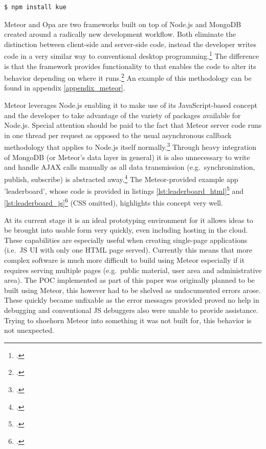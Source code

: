 \begin{appendices}
\begin{subappendices}
\begin{lstlisting}[language=javascript,
morekeywords={npm},
caption={Installing Kue via command-line},
label=lst:installkue]
$ npm install kue
\end{lstlisting}
\newpage

\label{appendix_meteor}
\FloatBarrier
Meteor and Opa are two frameworks built on top of Node.js and MongoDB created around a radically new development workflow. Both eliminate the distinction between client-side and server-side code, instead the developer writes code in a very similar way to conventional desktop programming.\footcite[Cf.][]{meteorDocs} The difference is that the framework provides functionality to that enables the code to alter its behavior depending on where it runs.\footcite[Cf.][]{meteorDocs} An example of this methodology can be found in appendix \ref{appendix_meteor}.

Meteor leverages Node.js enabling it to make use of its JavaScript-based concept and  the developer to take advantage of the variety of packages available for Node.js. Special attention should be paid to the fact that Meteor server code runs in one thread per request as opposed to the usual asynchronous callback methodology that applies to Node.js itself normally.\footcite[Cf.][]{meteorDocs} Through heavy integration of MongoDB (or Meteor's data layer in general) it is also unnecessary to write and handle AJAX calls manually as all data transmission (e.g.\ synchronization, publish, subscribe) is abstracted away.\footcite[Cf.][]{meteorDocs} The Meteor-provided example app 'leaderboard', whose code is provided in listings \ref{lst:leaderboard_html}\footcite[Cf.][]{leaderboard} and \ref{lst:leaderboard_js}\footcite[Cf.][]{leaderboard} (CSS omitted), highlights this concept very well.

At its current stage it is an ideal prototyping environment for it allows ideas to be brought into usable form very quickly, even including hosting in the cloud. These capabilities are especially useful when creating single-page applications (i.e.\ JS UI with only one HTML page served). Currently this means that more complex software is much more difficult to build using Meteor especially if it requires serving multiple pages (e.g.\ public material, user area and administrative area). The POC implemented as part of this paper was originally planned to be built using Meteor, this however had to be shelved as undocumented errors arose. These quickly became unfixable as the error messages provided proved no help in debugging and conventional JS debuggers also were unable to provide assistance.
Trying to shoehorn Meteor into something it was not built for, this behavior is not unexpected.


\end{subappendices}
\end{appendices}
